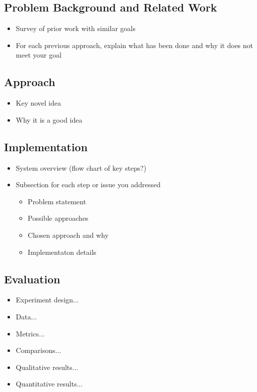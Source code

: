 \documentclass[pageno]{jpaper}
\begin{document}
\subsection{Problem Background and Related Work}
\begin{itemize}
\item Survey of prior work with similar goals 
\item For each previous approach, explain what has been done and why it does not meet your goal
\end{itemize}

\subsection{Approach}
\begin{itemize}
\item Key novel idea
\item Why it is a good idea
\end{itemize}

\subsection{Implementation}
\begin{itemize}
\item System overview (flow chart of key steps?)
\item Subsection for each step or issue you addressed
\begin{itemize}
\item Problem statement
\item Possible approaches
\item Chosen approach and why
\item Implementaton details
\end{itemize}
\end{itemize}

\subsection{Evaluation}
\begin{itemize}
\item Experiment design...
\item Data...
\item Metrics...
\item Comparisons...
\item Qualitative results...
\item Quantitative results...
\end{itemize}
\end{document}
